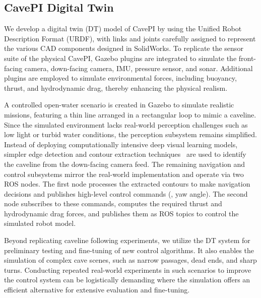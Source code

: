 \subsection{CavePI Digital Twin}
We develop a digital twin (DT) model of CavePI by using the Unified Robot Description Format (URDF), with links and joints carefully assigned to represent the various CAD components designed in SolidWorks. To replicate the sensor suite of the physical CavePI, Gazebo plugins are integrated to simulate the front-facing camera, down-facing camera, IMU, pressure sensor, and sonar. Additional plugins are employed to simulate environmental forces, including buoyancy, thrust, and hydrodynamic drag, thereby enhancing the physical realism.

A controlled open-water scenario is created in Gazebo to simulate realistic missions, featuring a thin line arranged in a rectangular loop to mimic a caveline. Since the simulated environment lacks real-world perception challenges such as low light or turbid water conditions, the perception subsystem remains simplified. Instead of deploying computationally intensive deep visual learning models, simpler edge detection and contour extraction techniques~\cite{SUZUKI198532} are used to identify the caveline from the down-facing camera feed. The remaining navigation and control subsystems mirror the real-world implementation and operate via two ROS nodes. The first node processes the extracted contours to make navigation decisions and publishes high-level control commands (\eg, yaw angle). The second node subscribes to these commands, computes the required thrust and hydrodynamic drag forces, and publishes them as ROS topics to control the simulated robot model.

Beyond replicating caveline following experiments, we utilize the DT system for preliminary testing and fine-tuning of new control algorithms. It also enables the simulation of complex cave scenes, such as narrow passages, dead ends, and sharp turns. Conducting repeated real-world experiments in such scenarios to improve the control system can be logistically demanding where the simulation offers an efficient alternative for extensive evaluation and fine-tuning.  


